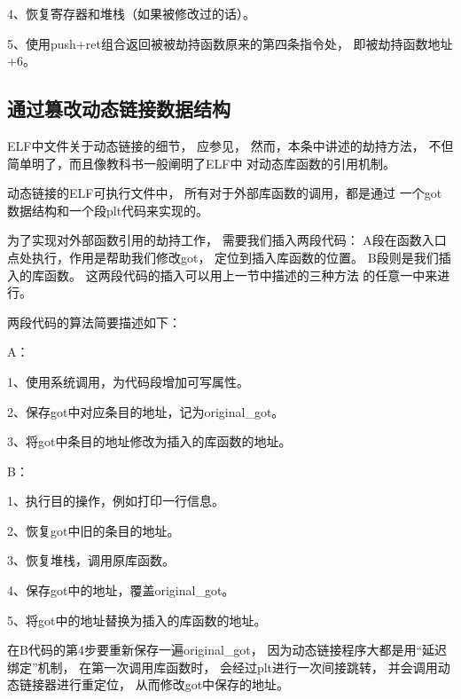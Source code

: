 4、恢复寄存器和堆栈（如果被修改过的话）。

5、使用push+ret组合返回被被劫持函数原来的第四条指令处，
即被劫持函数地址+6。



\subsection{通过篡改动态链接数据结构}
\label{sub_plt}

ELF中文件关于动态链接的细节，
应参见\cite{elf1.2}，
然而，本条中讲述的劫持方法，
不但简单明了，而且像教科书一般阐明了ELF中
对动态库函数的引用机制。

动态链接的ELF可执行文件中，
所有对于外部库函数的调用，都是通过
一个got数据结构和一个段plt代码来实现的。


为了实现对外部函数引用的劫持工作，
需要我们插入两段代码：
A段在函数入口点处执行，作用是帮助我们修改got，
定位到插入库函数的位置。
B段则是我们插入的库函数。
这两段代码的插入可以用上一节中描述的三种方法
的任意一中来进行。

两段代码的算法简要描述如下：

A：

1、使用系统调用，为代码段增加可写属性。

2、保存got中对应条目的地址，记为original\_got。

3、将got中条目的地址修改为插入的库函数的地址。

B：

1、执行目的操作，例如打印一行信息。

2、恢复got中旧的条目的地址。

3、恢复堆栈，调用原库函数。

4、保存got中的地址，覆盖original\_got。

5、将got中的地址替换为插入的库函数的地址。

在B代码的第4步要重新保存一遍original\_got，
因为动态链接程序大都是用“延迟绑定”机制，
在第一次调用库函数时，
会经过plt进行一次间接跳转，
并会调用动态链接器进行重定位，
从而修改got中保存的地址。





















